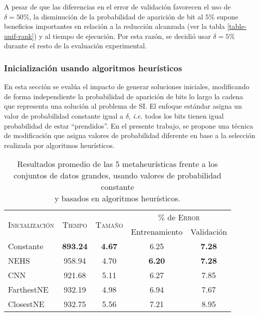 A pesar de que las diferencias en el error de validación favorecen el uso de\linebreak$\delta = 50\%$, la disminución de la probabilidad de aparición de bit al $5\%$ supone beneficios importantes en relación a la reducción alcanzada (ver la tabla \ref{table-unif-rank}) y al tiempo de ejecución. Por esta razón, se decidió usar $\delta = 5\%$ durante el resto de la evaluación experimental.

\subsubsection{Inicialización usando algoritmos heurísticos}

En esta sección se evalúa el impacto de generar soluciones iniciales, modificando de forma independiente la probabilidad de aparición de bits lo largo la cadena que representa una solución al problema de SI. El enfoque estándar asigna un valor de probabilidad constante igual a $\delta$, \emph{i.e.} todos los bits tienen igual probabilidad de estar ``prendidos''. En el presente trabajo, se propone una técnica de modificación que asigna valores de probabilidad diferente en base a la selección realizada por algoritmos heurísticos.

\begin{table}[h!]
\centering
\begin{tabular}{l c c c c}
\hline
\multirow{2}{*}{\textsc{Inicialización}}
	& \multirow{2}{*}{\textsc{Tiempo}}
	& \multirow{2}{*}{\textsc{Tamaño}}
	& \multicolumn{2}{c}{$\%$ de \textsc{Error}} \\\cline{4-5}
 & & & \scriptsize{Entrenamiento} & \scriptsize{Validación} \\
\hline
\hline
Constante  & \textbf{893.24} & \textbf{4.67} & 6.25 & \textbf{7.28} \\
NEHS       & 958.94 & 4.70 & \textbf{6.20} & \textbf{7.28} \\
CNN        & 921.68 & 5.11 & 6.27 & 7.85 \\
FarthestNE & 932.19 & 4.98 & 6.94 & 7.67 \\
ClosestNE  & 932.75 & 5.56 & 7.21 & 8.95 \\
\hline
\end{tabular}
\caption[Resultados usando probabilidades constantes y basadas en heurísticas]{Resultados promedio de las 5 metaheurísticas frente a los\\conjuntos de datos grandes, usando valores de probabilidad constante\\y basados en algoritmos heurísticos.}
\label{table-inits}
\end{table}

